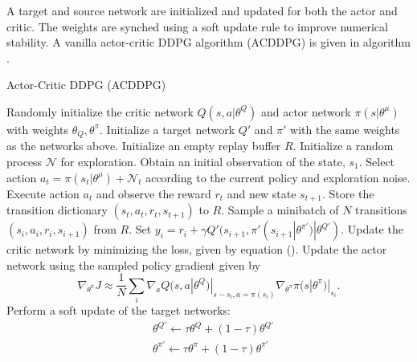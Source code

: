 \documentclass[10pt,conference]{IEEEtran}
\begin{document}
	A target and source network are initialized and updated for both the actor and critic. The weights are synched using a soft update rule to improve numerical stability. A vanilla actor-critic DDPG algorithm (ACDDPG) is given in algorithm .
	\begin{algorithm}
		\caption{Actor-Critic DDPG (ACDDPG)}
		\begin{algorithmic}[1]
			\STATE Randomly initialize the critic network $Q(s, a|\theta^Q)$ and actor network $\pi(s|\theta^\mu)$ with weights $\theta_Q, \theta^\pi$. 
			\STATE Initialize a target network $Q'$ and $\pi'$ with the same weights as the networks above. 
			\STATE Initialize an empty replay buffer $R$.
				\STATE Initialize a random process $\mathcal{N}$ for exploration. 
				\STATE Obtain an initial observation of the state, $s_1$. 
					\STATE Select action $a_t = \pi(s_t|\theta^\mu) + \mathcal{N}_t$ according to the current policy and exploration noise.
					\STATE Execute action $a_t$ and observe the reward $r_t$ and new state $s_{t+1}$. 
					\STATE Store the transition dictionary $(s_t, a_t, r_t, s_{t+1})$ to $R$.
					\STATE Sample a minibatch of $N$ transitions $(s_i, a_i, r_i, s_{i+1})$ from $R$.
					\STATE Set $y_i = r_i + \gamma Q'(s_{i+1}, \pi'(s_{i+1}|\theta^{\pi'})|\theta^{Q'})$. 
					\STATE Update the critic network by minimizing the loss, given by equation ().
					\STATE Update the actor network using the sampled policy gradient given by 
					\begin{equation*}
						\displaystyle \nabla_{\theta^\pi} J \approx \frac{1}{N}\sum\limits_{i}{\nabla_a Q(s,a|\theta^Q)|_{s - s_i, a = \pi(s_i)}\nabla_{\theta^\pi}\pi(s|\theta^\pi)|_{s_i}}.
					\end{equation*}
					\STATE Perform a soft update of the target networks:
					\begin{align*}
						&\theta^{Q'} \leftarrow \tau\theta^Q + (1-\tau)\theta^{Q'} \\
						&\theta^{\pi'} \leftarrow \tau \theta^\pi + (1-\tau)\theta^{\pi'}
					\end{align*}
				\ENDFOR
			\ENDFOR
		\end{algorithmic}
		\label{acddpg}
	\end{algorithm}
\end{document}
